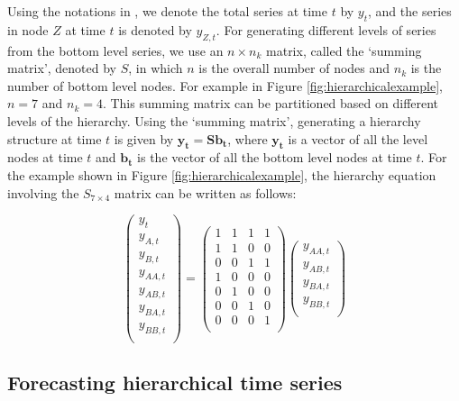 \documentclass[11pt,a4paper,]{article}
\begin{document}
Using the notations in \textcite{hyndman2016fast}, we denote the total
series at time \(t\) by \(y_t\), and the series in node \(Z\) at time
\(t\) is denoted by \(y_{Z,t}\). For generating different levels of
series from the bottom level series, we use an \(n\times n_k\) matrix,
called the `summing matrix', denoted by \(S\), in which \(n\) is the
overall number of nodes and \(n_k\) is the number of bottom level nodes.
For example in Figure \ref{fig:hierarchicalexample}, \(n = 7\) and
\(n_k = 4\). This summing matrix can be partitioned based on different
levels of the hierarchy. Using the `summing matrix', generating a
hierarchy structure at time \(t\) is given by
\(\mathbf{y_t}=\mathbf{Sb_t}\), where \(\mathbf{y_t}\) is a vector of
all the level nodes at time \(t\) and \(\mathbf{b_t}\) is the vector of
all the bottom level nodes at time \(t\). For the example shown in
Figure \ref{fig:hierarchicalexample}, the hierarchy equation involving
the \(S_{7\times 4}\) matrix can be written as follows:

\begin{equation}\label{eq:Smatrixexample}
\left(\begin{array}{c} 
y_{t}\\y_{A,t}\\y_{B,t}\\y_{AA,t}\\y_{AB,t}\\y_{BA,t}\\y_{BB,t}\\
\end{array}\right)
=\left(\begin{array}{cccc} 
1&1&1&1\\1&1&0&0\\0&0&1&1\\1&0&0&0\\0&1&0&0\\0&0&1&0\\0&0&0&1\\
\end{array}\right)
\left(\begin{array}{c} 
y_{AA,t}\\y_{AB,t}\\y_{BA,t}\\y_{BB,t}\\
\end{array}\right)
\end{equation}

\hypertarget{forecasting-hierarchical-time-series}{\subsection{Forecasting
hierarchical time series}\label{forecasting-hierarchical-time-series}}
\end{document}
